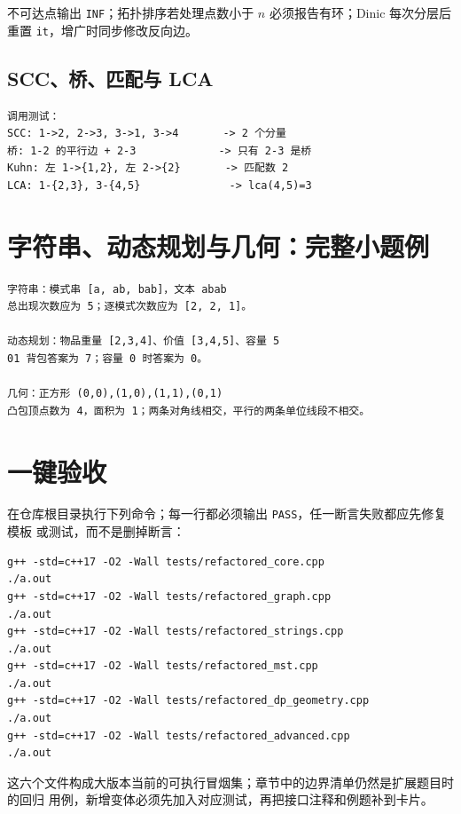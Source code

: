 不可达点输出 \texttt{INF}；拓扑排序若处理点数小于 \(n\) 必须报告有环；Dinic 每次分层后
重置 \texttt{it}，增广时同步修改反向边。

\subsection{SCC、桥、匹配与 LCA}

\begin{lstlisting}
调用测试：
SCC: 1->2, 2->3, 3->1, 3->4       -> 2 个分量
桥: 1-2 的平行边 + 2-3             -> 只有 2-3 是桥
Kuhn: 左 1->{1,2}, 左 2->{2}       -> 匹配数 2
LCA: 1-{2,3}, 3-{4,5}              -> lca(4,5)=3
\end{lstlisting}

\section{字符串、动态规划与几何：完整小题例}

\begin{lstlisting}
字符串：模式串 [a, ab, bab]，文本 abab
总出现次数应为 5；逐模式次数应为 [2, 2, 1]。

动态规划：物品重量 [2,3,4]、价值 [3,4,5]、容量 5
01 背包答案为 7；容量 0 时答案为 0。

几何：正方形 (0,0),(1,0),(1,1),(0,1)
凸包顶点数为 4，面积为 1；两条对角线相交，平行的两条单位线段不相交。
\end{lstlisting}

\section{一键验收}

在仓库根目录执行下列命令；每一行都必须输出 \texttt{PASS}，任一断言失败都应先修复模板
或测试，而不是删掉断言：

\begin{lstlisting}
g++ -std=c++17 -O2 -Wall tests/refactored_core.cpp
./a.out
g++ -std=c++17 -O2 -Wall tests/refactored_graph.cpp
./a.out
g++ -std=c++17 -O2 -Wall tests/refactored_strings.cpp
./a.out
g++ -std=c++17 -O2 -Wall tests/refactored_mst.cpp
./a.out
g++ -std=c++17 -O2 -Wall tests/refactored_dp_geometry.cpp
./a.out
g++ -std=c++17 -O2 -Wall tests/refactored_advanced.cpp
./a.out
\end{lstlisting}

这六个文件构成大版本当前的可执行冒烟集；章节中的边界清单仍然是扩展题目时的回归
用例，新增变体必须先加入对应测试，再把接口注释和例题补到卡片。
